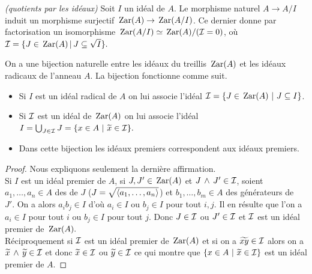 \begin{fact}
\label{factQuotients} \emph{(quotients par les idéaux)}
Soit $I$ un idéal de $A$. 
Le morphisme naturel $A\to A/I$ induit un morphisme surjectif $\,{\rm Zar}(A)\to\,{\rm Zar}(A/I)$. Ce dernier donne par factorisation un isomorphisme $\,{\rm Zar}(A/I)\simeq
\,{\rm Zar}(A)/({\cal I} =0)$, où ${{\cal I}} = \{ J \in \,{\rm Zar}(A)\,\vert\,J \subseteq \sqrt I\}.$
\end{fact}


\begin{proposition}
\label{propZar2}
On a une bijection naturelle entre les
idéaux du treillis $\,{\rm Zar}(A)$ et les idéaux radicaux de l'anneau $A$. La bijection fonctionne comme suit.
\begin{itemize}
%
\item Si $I$ est un idéal radical de $A$ on lui  associe l'idéal
${{\cal I}} = \{ J \in \,{\rm Zar}(A)~|~ J \subseteq I\}$.
%
\item  Si $\cal{I}$ est un idéal
de $\,{\rm Zar}(A)$ on lui associe l'idéal
$I=\bigcup\nolimits _{J\in\cal{I}}J=\{ x\in A~|~\widetilde{x}\in \cal{I}\}.$
%
\item Dans cette bijection les idéaux premiers correspondent aux idéaux
premiers. 
\end{itemize}
\end{proposition}
\begin{proof}
Nous expliquons seulement la dernière affirmation.\\
Si $I$ est un idéal premier de $A$, si $J,J'\in \,{\rm Zar}(A)$ et
$J\,\wedge\, J'\in \cal{I}$, soient $a_1,\dots,a_n\in A$ des 
de $J$ (\cad $J=\sqrt{\left\langle{a_1,\dots,a_n}\right\rangle}$) et $b_1,\dots,b_m\in A$ des
générateurs de~$J'.$ On a alors
$a_ib_j\in I$ d'où $a_i\in I$ ou $b_j\in I$ pour tout $i,j.$ Il en
résulte que l'on a $a_i\in I$ pour tout $i$ ou
$b_j\in I$ pour tout $j$. Donc $J\in \cal{I}$ ou $J'\in \cal{I}$ et
$\cal{I}$ est un idéal premier de $\,{\rm Zar}(A).$
\\
Réciproquement si $\cal{I}$ est un idéal premier de $\,{\rm Zar}(A)$
et si on a $\widetilde{xy}\in \cal{I}$ alors on a
$\widetilde{x}\,\wedge\, \widetilde{y}\in \cal{I}$ et donc $\widetilde{x}\in \cal{I}$
ou $\widetilde{y}\in \cal{I}$ ce qui montre que $\{ x\in A~|~\widetilde{x}\in \cal{I}\}$
est un idéal premier de $A.$
\end{proof}

